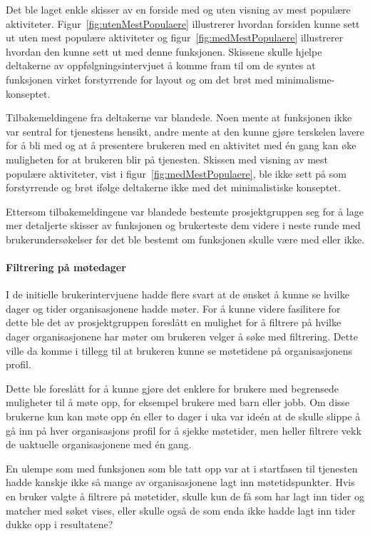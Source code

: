 Det ble laget enkle skisser av en forside med og uten visning av mest populære aktiviteter. Figur~\ref{fig:utenMestPopulaere} illustrerer hvordan forsiden kunne sett ut uten mest populære aktiviteter og figur~\ref{fig:medMestPopulaere} illustrerer hvordan den kunne sett ut med denne funksjonen. Skissene skulle hjelpe deltakerne av oppfølgningsintervjuet å komme fram til om de syntes at funksjonen virket forstyrrende for layout og om det brøt med minimalisme-konseptet.

Tilbakemeldingene fra deltakerne var blandede. Noen mente at funksjonen ikke var sentral for tjenestens hensikt, andre mente at den kunne gjøre terskelen lavere for å bli med og at å presentere brukeren med en aktivitet med én gang kan øke muligheten for at brukeren blir på tjenesten. Skissen med visning av mest populære aktiviteter, vist i figur~\ref{fig:medMestPopulaere}, ble ikke sett på som forstyrrende og brøt ifølge deltakerne ikke med det minimalistiske konseptet. 

Ettersom tilbakemeldingene var blandede bestemte prosjektgruppen seg for å lage mer detaljerte skisser av funksjonen og brukerteste dem videre i neste runde med brukerundersøkelser før det ble bestemt om funksjonen skulle være med eller ikke.

\paragraph{Filtrering på møtedager}
I de initielle brukerintervjuene hadde flere svart at de ønsket å kunne se hvilke dager og tider organisasjonene hadde møter. For å kunne videre fasilitere for dette ble det av prosjektgruppen foreslått en mulighet for å filtrere på hvilke dager organisasjonene har møter om brukeren velger å søke med filtrering. Dette ville da komme i tillegg til at brukeren kunne se møtetidene på organisasjonens profil. 

Dette ble foreslått for å kunne gjøre det enklere for brukere med begrensede muligheter til å møte opp, for eksempel brukere med barn eller jobb. Om disse brukerne kun kan møte opp én eller to dager i uka var ideén at de skulle slippe å gå inn på hver organisasjons profil for å sjekke møtetider, men heller filtrere vekk de uaktuelle organisasjonene med én gang.

En ulempe som med funksjonen som ble tatt opp var at i startfasen til tjenesten hadde kanskje ikke så mange av organisasjonene lagt inn møtetidspunkter. Hvis en bruker valgte å filtrere på møtetider, skulle kun de få som har lagt inn tider og matcher med søket vises, eller skulle også de som enda ikke hadde lagt inn tider dukke opp i resultatene?

